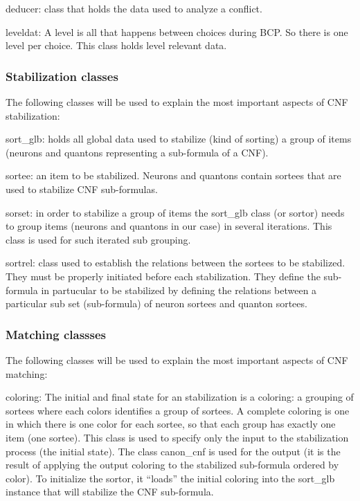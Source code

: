 \documentclass{easychair}
\begin{document}
deducer: class that holds the data used to analyze a conflict.

leveldat: A level is all that happens between choices during BCP. So there is one level per choice. This class holds level relevant data.

\subsubsection{Stabilization classes}

The following classes will be used to explain the most important aspects of CNF  stabilization:

sort\_glb: holds all global data used to stabilize (kind of sorting) a group of items (neurons and quantons representing a sub-formula of a CNF).

sortee: an item to be stabilized. Neurons and quantons contain sortees that are used to stabilize CNF sub-formulas. 

sorset: in  order to stabilize a group of items the sort\_glb class (or sortor) needs to group items (neurons and quantons in our case) in several iterations. This class is used for such iterated sub grouping.

sortrel: class used to establish the relations between the sortees to be stabilized. They must be properly initiated before each stabilization. They define the sub-formula in partucular to be stabilized by defining the relations between a particular sub set (sub-formula) of neuron sortees and quanton sortees.

\subsubsection{Matching classses}

The following classes will be used to explain the most important aspects of CNF  matching:

coloring: The initial and final state for an stabilization is a coloring: a grouping of sortees where each colors identifies a group of sortees. A complete coloring is one in which there is one color for each sortee, so that each group has exactly one item (one sortee). This class is used to specify only the input to the stabilization process (the initial state). The class canon\_cnf is used for the output (it is the result of applying the output coloring to the stabilized sub-formula ordered by color). To initialize the sortor, it “loads” the initial coloring into the sort\_glb instance that will stabilize the CNF sub-formula.
\end{document}
